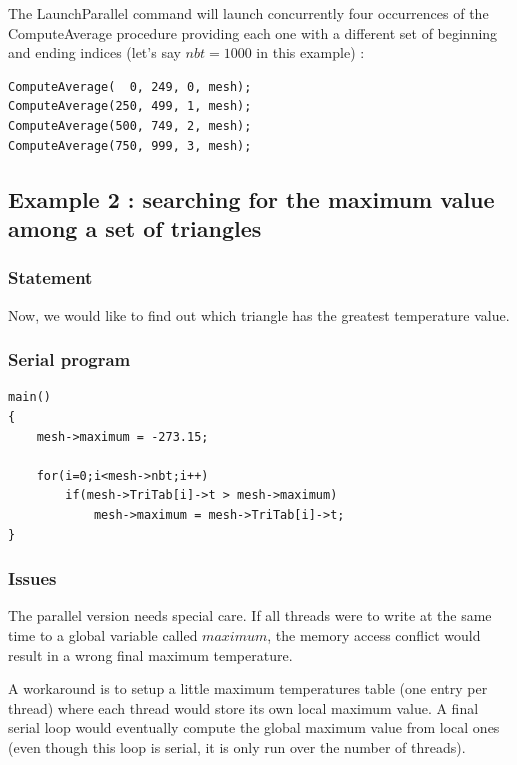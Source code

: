 \documentclass[a4paper,12pt]{article}
\begin{document}
The LaunchParallel command will launch concurrently four occurrences of the ComputeAverage procedure providing each one with a different set of beginning and ending indices (let's say $nbt = 1000$ in this example) :

\begin{tt}
\begin{verbatim}
ComputeAverage(  0, 249, 0, mesh);
ComputeAverage(250, 499, 1, mesh);
ComputeAverage(500, 749, 2, mesh);
ComputeAverage(750, 999, 3, mesh);
\end{verbatim}
\end{tt}
\normalfont


\subsection{Example 2 : searching for the maximum value among a set of triangles}

\subsubsection{Statement}
Now, we would like to find out which triangle has the greatest temperature value.

\subsubsection{Serial program}

\begin{tt}
\begin{verbatim}
main()
{
    mesh->maximum = -273.15;

    for(i=0;i<mesh->nbt;i++)
        if(mesh->TriTab[i]->t > mesh->maximum)
            mesh->maximum = mesh->TriTab[i]->t;
}
\end{verbatim}
\end{tt}
\normalfont

\subsubsection{Issues}

The parallel version needs special care. If all threads were to write at the same time to a global variable called $maximum$, the memory access conflict would result in a wrong final maximum temperature.

A workaround is to setup a little maximum temperatures table (one entry per thread) where each thread would store its own local maximum value. A final serial loop would eventually compute the global maximum value from local ones (even though this loop is serial, it is only run over the number of threads).
\end{document}
